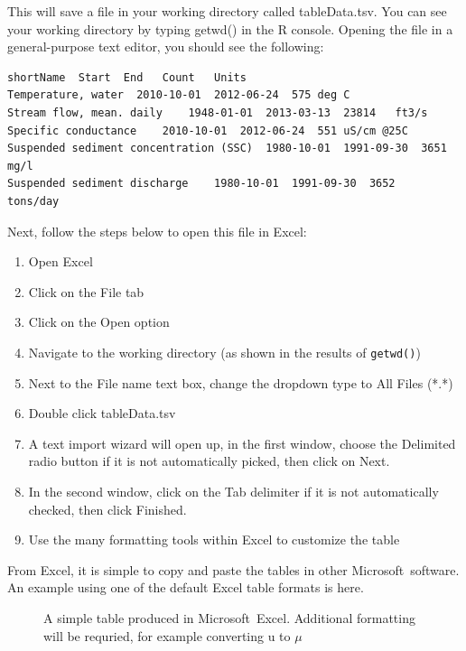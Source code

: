 \documentclass[a4paper,11pt]{article}\usepackage[]{graphicx}\usepackage[]{color}
\begin{document}
This will save a file in your working directory called tableData.tsv.  You can see your working directory by typing getwd() in the R console. Opening the file in a general-purpose text editor, you should see the following:

\begin{verbatim}
shortName  Start  End	Count	Units
Temperature, water	2010-10-01	2012-06-24	575	deg C
Stream flow, mean. daily	1948-01-01	2013-03-13	23814	ft3/s
Specific conductance	2010-10-01	2012-06-24	551	uS/cm @25C
Suspended sediment concentration (SSC)	1980-10-01	1991-09-30	3651	mg/l
Suspended sediment discharge	1980-10-01	1991-09-30	3652	tons/day
\end{verbatim}

Next, follow the steps below to open this file in Excel:
\begin{enumerate}
\item Open Excel
\item Click on the File tab
\item Click on the Open option
\item Navigate to the working directory (as shown in the results of \texttt{getwd()})
\item Next to the File name text box, change the dropdown type to All Files (*.*)
\item Double click tableData.tsv
\item A text import wizard will open up, in the first window, choose the Delimited radio button if it is not automatically picked, then click on Next.
\item In the second window, click on the Tab delimiter if it is not automatically checked, then click Finished.
\item Use the many formatting tools within Excel to customize the table
\end{enumerate}

From Excel, it is simple to copy and paste the tables in other Microsoft\textregistered\ software. An example using one of the default Excel table formats is here.

\begin{figure}[ht!]
\centering
\caption{A simple table produced in Microsoft\textregistered\ Excel. Additional formatting will be requried, for example converting u to  $\mu$ }
\label{overflow}
\end{figure}
\end{document}
